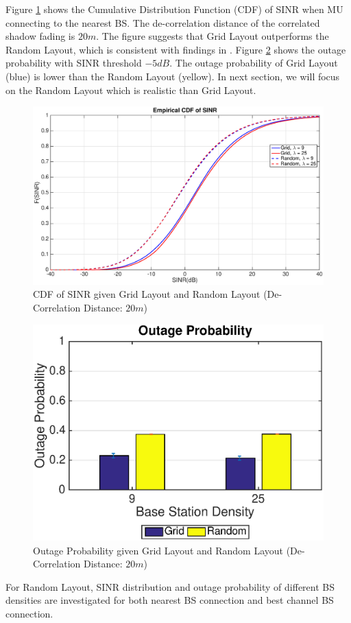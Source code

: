\par Figure \ref{cdf1} shows the Cumulative Distribution Function (CDF) of SINR when MU connecting to the nearest BS. The de-correlation distance of the correlated shadow fading is $20m$. The figure suggests that Grid Layout outperforms the Random Layout, which is consistent with findings in \cite{andrews2011tractable}. Figure \ref{outage1} shows the outage probability with SINR threshold $-5dB$. The outage probability of Grid Layout (blue) is lower than the Random Layout (yellow). In next section, we will focus on the Random Layout which is realistic than Grid Layout.
\begin{figure}
\centering
\includegraphics[width=14cm]{GridVSRandom.eps}
\caption{CDF of SINR given Grid Layout and Random Layout (De-Correlation Distance: $20m$)}
\label{cdf1}
\end{figure}
\begin{figure}
\centering
\includegraphics[width=14cm]{OutageProbGridVSRandom.eps}
\caption{Outage Probability given Grid Layout and Random Layout (De-Correlation Distance: $20m$)}
\label{outage1}
\end{figure}
\par For Random Layout, SINR distribution and outage probability of different BS densities are investigated for both nearest BS connection and best channel BS connection. 


